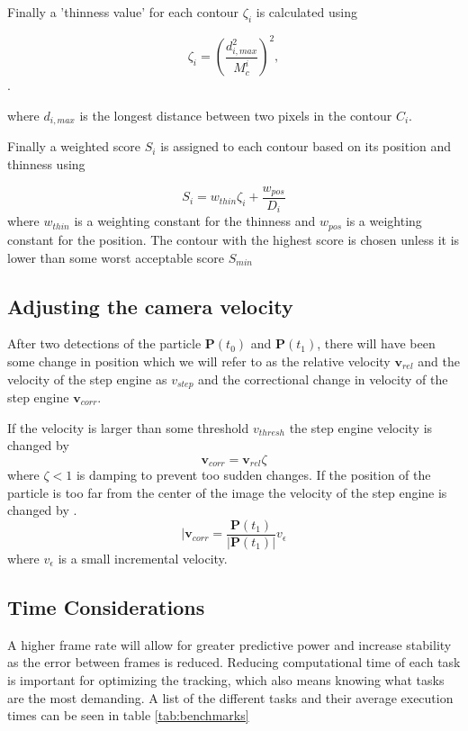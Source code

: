 Finally a 'thinness value' for each contour $\zeta_i$ is calculated using

\begin{equation}\label{eq:thinness}
\zeta_i =  \left(\frac{d_{i, max}^2}{M_c^i}\right)^2,
\end{equation}. 

where $d_{i,max}$ is the longest distance between two pixels in the contour $C_i$.

Finally a weighted score $S_i$ is assigned to each contour based on its position and thinness using

\begin{equation}
S_i = w_{thin}\zeta_i + \frac{w_{pos}}{D_i}
\end{equation}
\noindent where $w_{thin}$ is a weighting constant for the thinness and $w_{pos}$ is a weighting constant for the position. The contour with the highest score is chosen unless it is lower than some worst acceptable score $S_{min}$

\subsection{Adjusting the camera velocity}
After two detections of the particle $\mathbf{P}(t_0)$ and $\mathbf{P}(t_1)$, there will have been some change in position which we will refer to as the relative velocity $\mathbf{v}_{rel}$ and the velocity of the step engine as $v_{step}$ and the correctional change in velocity of the step engine $\mathbf{v}_{corr}$.

If the velocity is larger than some threshold $v_{thresh}$ the step engine velocity is changed by
\[
\mathbf{v}_{corr} = \mathbf{v}_{rel}\zeta
\]
where $\zeta < 1$ is damping to prevent too sudden changes. If the position of the particle is too far from the center of the image the velocity of the step engine is changed by .
\[|
\mathbf{v}_{corr} = \frac{\mathbf{P}(t_1)}{\left|\mathbf{P}(t_1)\right|}v_{\epsilon}
\] 
where $v_{\epsilon}$ is a small incremental velocity.


\subsection{Time Considerations}\label{sec:time considerations}
A higher frame rate will allow for greater predictive power and increase stability as the error between frames is 
reduced. Reducing computational time of each task is important for optimizing the tracking, which also means knowing 
what tasks are the most demanding. A list of the different tasks and their average execution times can be seen in table 
\ref{tab:benchmarks}


